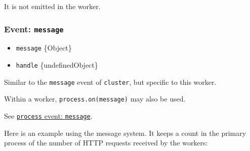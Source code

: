\begin{Shaded}
\begin{Highlighting}[]
\NormalTok{()}\NormalTok{(}\OperatorTok{,}\KeywordTok{=\textgreater{}}\NormalTok{ \{}
\NormalTok{\})}\OperatorTok{;}
\end{Highlighting}
\end{Shaded}

\begin{Shaded}
\begin{Highlighting}[]
\NormalTok{()}\NormalTok{(}\OperatorTok{,}\KeywordTok{=\textgreater{}}\NormalTok{ \{}
\NormalTok{\})}\OperatorTok{;}
\end{Highlighting}
\end{Shaded}

It is not emitted in the worker.

\subsubsection{\texorpdfstring{Event:
\texttt{\textquotesingle{}message\textquotesingle{}}}{Event: \textquotesingle message\textquotesingle{}}}\label{event-message}

\begin{itemize}
\tightlist
\item
  \texttt{message} \{Object\}
\item
  \texttt{handle} \{undefined\textbar Object\}
\end{itemize}

Similar to the \texttt{\textquotesingle{}message\textquotesingle{}}
event of \texttt{cluster}, but specific to this worker.

Within a worker,
\texttt{process.on(\textquotesingle{}message\textquotesingle{})} may
also be used.

See \href{process.md\#event-message}{\texttt{process} event:
\texttt{\textquotesingle{}message\textquotesingle{}}}.

Here is an example using the message system. It keeps a count in the
primary process of the number of HTTP requests received by the workers:


